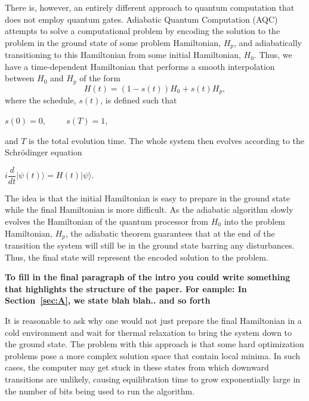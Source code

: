 \documentclass[%
 reprint,
 amsmath,amssymb,
 aps,
]{revtex4-1}
\begin{document}
   There is, however, an entirely different approach to quantum computation that does not employ quantum gates. Adiabatic Quantum Computation (AQC) attempts to solve a computational problem by encoding the solution to the problem in the ground state of some problem Hamiltonian, $H_p$, and adiabatically transitioning to this Hamiltonian from some initial Hamiltonian, $H_0$\cite{RevModPhys.90.015002}. Thus, we have a time-dependent Hamiltonian that performs a smooth interpolation between $H_0$ and $H_p$ of the form 
	\begin{equation}
		H(t) = (1-s(t))H_0 + s(t)H_p, 
		\label{eq:Ht}
	\end{equation}
where the schedule, $s(t)$, is defined such that
	\begin{center}
		$s(0) = 0, \hspace{1cm} s(T) = 1,$
	\end{center}
and $T$ is the total evolution time. The whole system then evolves according to the Schr{\"o}dinger equation
 	\begin{center}
		$i\dfrac{d}{dt}\vert\psi(t)\rangle = H(t)\vert\psi\rangle$.
	\end{center}
	
   The idea is that the initial Hamiltonian is easy to prepare in the ground state while the final Hamiltonian is more difficult. As the adiabatic algorithm slowly evolves the Hamiltonian of the quantum processor from $H_0$ into the problem Hamiltonian, $H_p$, the adiabatic theorem guarantees that at the end of the transition the system will still be in the ground state barring any disturbances. Thus, the final state will represent the encoded solution to the problem. 

   \textbf{To fill in the final paragraph of the intro you could write something that highlights the structure of the paper. For eample: In Section~\ref{sec:A}, we state blah blah.. and so forth}
   
   It is reasonable to ask why one would not just prepare the final Hamiltonian in a cold environment and wait for thermal relaxation to bring the system down to the ground state. The problem with this approach is that some hard optimization problems pose a more complex solution space that contain local minima. In such cases, the computer may get stuck in these states from which downward transitions are unlikely, causing equilibration time to grow exponentially large in the number of bits being used to run the algorithm.
   
\end{document}
